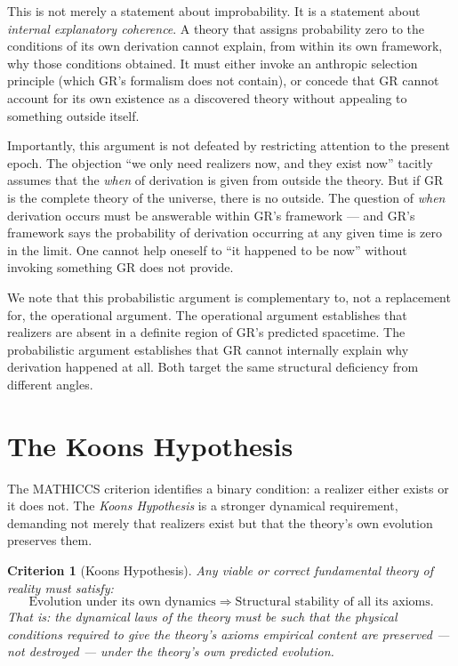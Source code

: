 \documentclass[11pt,a4paper]{article}
\newtheorem{criterion}{Criterion}
\begin{document}
This is not merely a statement about improbability. It is a statement about
\emph{internal explanatory coherence}. A theory that assigns probability zero to
the conditions of its own derivation cannot explain, from within its own framework,
why those conditions obtained. It must either invoke an anthropic selection principle
(which GR's formalism does not contain), or concede that GR cannot account for its own
existence as a discovered theory without appealing to something outside itself.

Importantly, this argument is not defeated by restricting attention to the present
epoch. The objection ``we only need realizers now, and they exist now'' tacitly
assumes that the \emph{when} of derivation is given from outside the theory. But if
GR is the complete theory of the universe, there is no outside. The question of
\emph{when} derivation occurs must be answerable within GR's framework --- and GR's
framework says the probability of derivation occurring at any given time is zero in the
limit. One cannot help oneself to ``it happened to be now'' without invoking
something GR does not provide.

We note that this probabilistic argument is complementary to, not a replacement for,
the operational argument. The operational argument establishes that realizers are
absent in a definite region of GR's predicted spacetime. The probabilistic argument
establishes that GR cannot internally explain why derivation happened at all. Both
target the same structural deficiency from different angles.

\section{The Koons Hypothesis}
\label{sec:koons}

The MATHICCS criterion identifies a binary condition: a realizer either exists or it
does not. The \emph{Koons Hypothesis} is a stronger dynamical requirement, demanding
not merely that realizers exist but that the theory's own evolution preserves them.

\begin{criterion}[Koons Hypothesis]
\label{crit:koons}
Any viable or correct fundamental theory of reality must satisfy:
\[
\text{Evolution under its own dynamics} \;\Rightarrow\; \text{Structural stability of all its axioms.}
\]
That is: the dynamical laws of the theory must be such that the physical conditions
required to give the theory's axioms empirical content are preserved --- not destroyed
--- under the theory's own predicted evolution.
\end{criterion}
\end{document}
